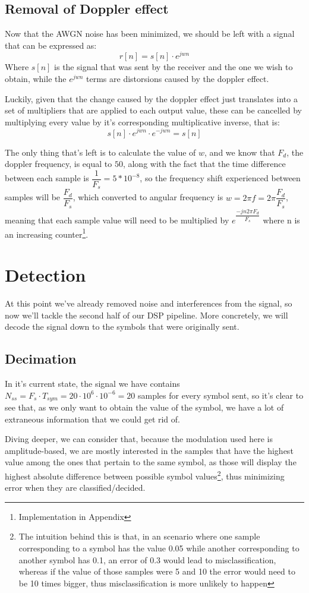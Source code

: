 \documentclass[conference,9pt]{IEEEtran}
\begin{document}
\subsection{Removal of Doppler effect}
Now that the AWGN noise has been minimized, we should be left with a signal that can be expressed as:
$$r[n]=s[n]\cdot e^{jwn}$$
Where $s[n]$ is the signal that was sent by the receiver and the one we wish to obtain, while the $e^{jwn}$ terms are distorsions caused by the doppler effect.

Luckily, given that the change caused by the doppler effect just translates into a set of multipliers that are applied to each output value, these can be cancelled by multiplying every value by it's corresponding multiplicative inverse, that is:
$$s[n]\cdot e^{jwn} \cdot e^{-jwn} = s[n]$$

The only thing that's left is to calculate the value of $w$, and we know that $F_d$, the doppler frequency, is equal to $50$, along with the fact that the time difference between each sample is $\dfrac{1}{F_s}=5*10^{-8}$, so the frequency shift experienced between samples will be $\dfrac{F_d}{F_s}$, which converted to angular frequency is $w=2\pi f=2\pi \dfrac{F_d}{F_s}$, meaning that each sample value will need to be multiplied by $e^{\dfrac{-jn2\pi F_d}{F_s}}$ where n is an increasing counter\footnote{Implementation in Appendix}.



\section{Detection}
At this point we've already removed noise and interferences from the signal, so now we'll tackle the second half of our DSP pipeline. More concretely, we will decode the signal down to the symbols that were originally sent.

\subsection{Decimation}
In it's current state, the signal we have contains $N_{ss}=F_s \cdot T_{sym}=20\cdot10^6 \cdot 10^{-6} = 20$ samples for every symbol sent, so it's clear to see that, as we only want to obtain the value of the symbol, we have a lot of extraneous information that we could get rid of.

Diving deeper, we can consider that, because the modulation used here is amplitude-based, we are mostly interested in the samples that have the highest value among the ones that pertain to the same symbol, as those will display the highest absolute difference between possible symbol values\footnote{The intuition behind this is that, in an scenario where one sample corresponding to a symbol has the value 0.05 while another corresponding to another symbol has 0.1, an error of 0.3 would lead to misclassification, whereas if the value of those samples were 5 and 10 the error would need to be 10 times bigger, thus misclassification is more unlikely to happen}, thus minimizing error when they are classified/decided.
\end{document}
